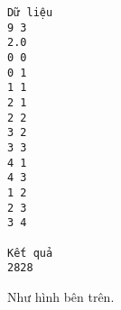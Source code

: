 \begin{verbatim}
Dữ liệu
9 3
2.0
0 0
0 1
1 1
2 1
2 2
3 2
3 3
4 1
4 3
1 2
2 3
3 4

Kết quả
2828
\end{verbatim}
Như hình bên trên.